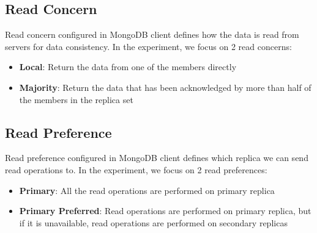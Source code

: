 \documentclass[12pt]{article}
\begin{document}
\subsection{Read Concern}
Read concern configured in MongoDB client defines how the data is read from servers for data consistency. In the experiment, we focus on 2 read concerns:\\
\begin{itemize}
  \item \textbf{Local}: Return the data from one of the members directly
  \item \textbf{Majority}: Return the data that has been acknowledged by more than half of the members in the replica set
\end{itemize}
\subsection{Read Preference}
Read preference configured in MongoDB client defines which replica we can send read operations to. In the experiment, we focus on 2 read preferences:\\
\begin{itemize}
  \item \textbf{Primary}: All the read operations are performed on primary replica
  \item \textbf{Primary Preferred}: Read operations are performed on primary replica, but if it is unavailable, read operations are performed on secondary replicas
\end{itemize}
\end{document}
